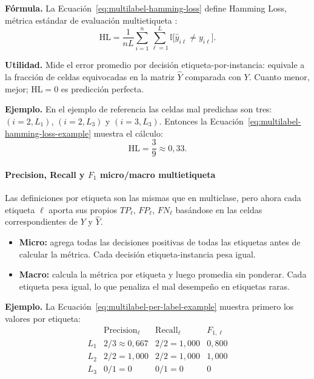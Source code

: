 \documentclass[12pt,oneside]{report}
\newcommand{\ind}{\mathbb{I}} %
\begin{document}
\textbf{Fórmula.} La Ecuación~\eqref{eq:multilabel-hamming-loss} define Hamming Loss, métrica estándar de evaluación multietiqueta \cite{tsoumakas_multilabel_overview,read2011}:
\begin{equation}
\label{eq:multilabel-hamming-loss}
\mathrm{HL}=\frac{1}{nL}\sum_{i=1}^n\sum_{\ell=1}^L \ind\big[\hat{y}_{i\ell}\ne y_{i\ell}\big].
\end{equation}

\textbf{Utilidad.} Mide el error promedio por decisión
etiqueta-por-instancia: equivale a la fracción de celdas equivocadas en
la matriz $\hat{Y}$ comparada con $Y$. Cuanto menor, mejor;
$\mathrm{HL}=0$ es predicción perfecta.

\textbf{Ejemplo.} En el ejemplo de referencia las celdas mal predichas
son tres: $(i{=}2,L_1)$, $(i{=}2,L_3)$ y $(i{=}3,L_3)$. Entonces la Ecuación~\eqref{eq:multilabel-hamming-loss-example} muestra el cálculo:
\begin{equation}
\label{eq:multilabel-hamming-loss-example}
\mathrm{HL}=\frac{3}{9}\approx 0{,}33.
\end{equation}

\paragraph{Precision, Recall y $F_1$ micro/macro multietiqueta}

Las definiciones por etiqueta son las mismas que en multiclase, pero
ahora cada etiqueta $\ell$ aporta sus propios $TP_\ell$, $FP_\ell$,
$FN_\ell$ basándose en las celdas correspondientes de $Y$ y $\hat Y$.
\begin{itemize}[leftmargin=*]
  \item \textbf{Micro:} agrega todas las decisiones positivas de todas
  las etiquetas antes de calcular la métrica. Cada decisión
  etiqueta-instancia pesa igual.
  \item \textbf{Macro:} calcula la métrica por etiqueta y luego promedia
  sin ponderar. Cada etiqueta pesa igual, lo que penaliza el mal
  desempeño en etiquetas raras.
\end{itemize}

\textbf{Ejemplo.} La Ecuación~\eqref{eq:multilabel-per-label-example} muestra primero los valores por etiqueta:
\begin{equation}
\label{eq:multilabel-per-label-example}
\begin{array}{l|ccc}
 & \mathrm{Precision}_\ell & \mathrm{Recall}_\ell & F_{1,\ell} \\
\hline
L_1 & 2/3\approx 0{,}667 & 2/2 = 1{,}000 & 0{,}800 \\
L_2 & 2/2 = 1{,}000      & 2/2 = 1{,}000 & 1{,}000 \\
L_3 & 0/1 = 0            & 0/1 = 0       & 0
\end{array}
\end{equation}
\end{document}
